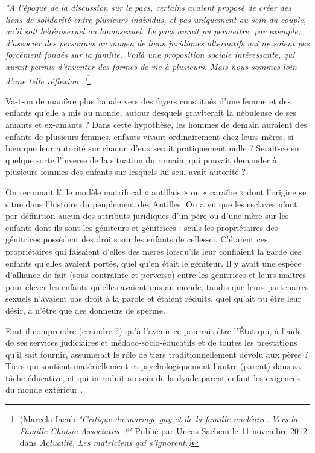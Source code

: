\begin{displayquote}
{\emph{"A l'époque de la discussion sur le pacs, certains avaient proposé de créer des liens de solidarité entre plusieurs individus, et pas uniquement au sein du couple, qu'il soit hétérosexuel ou homosexuel. Le pacs aurait pu permettre, par exemple, d'associer des personnes au moyen de liens juridiques alternatifs qui ne soient pas forcément fondés sur la famille. Voilà une proposition sociale intéressante, qui aurait permis d'inventer des formes de vie à plusieurs. Mais nous sommes loin d'une telle réflexion.."}\footnote{(Marcela Iacub \emph{"Critique du mariage gay et de la famille nucléaire. Vers la Famille Choisie Associative ?"} 
Publié par Uncas Sachem le 11 novembre 2012 dans \emph{Actualité, Les matriciens qui s'ignorent.)}}} 
 \end{displayquote}
 
 Va-t-on de manière plus banale vers des foyers constitués d'une femme et des enfants qu'elle a mis au monde, autour desquels graviterait la nébuleuse de ses amants et ex-amants ? Dans cette hypothèse, les hommes de demain auraient des enfants de plusieurs femmes, enfants vivant ordinairement chez leurs mères, si bien que leur autorité sur chacun d'eux serait pratiquement nulle ? Serait-ce en quelque sorte l'inverse de la situation du  romain, qui pouvait demander à plusieurs femmes des enfants sur lesquels lui seul avait autorité ? 
 
 On reconnait là le modèle matrifocal « antillais » ou « caraïbe » dont l'origine se situe dans l'histoire du peuplement des Antilles. On a vu que les esclaves n'ont par définition aucun des attributs juridiques d'un père ou d'une mère sur les enfants dont ils sont les géniteurs et génitrices : seuls les propriétaires des génitrices possèdent des droits sur les enfants de celles-ci. C'étaient ces propriétaires qui faisaient d'elles des mères lorsqu'ils leur confiaient la garde des enfants qu'elles avaient portés, quel qu'en était le géniteur. Il y avait une espèce d'alliance de fait (sous contrainte et perverse) entre les génitrices et leurs maîtres pour élever les enfants qu'elles avaient mis au monde, tandis que leurs partenaires sexuels n'avaient pas droit à la parole et étaient réduits, quel qu'ait pu être leur désir,  à n'être que des donneurs de sperme. 
 

 
 Faut-il comprendre (craindre ?) qu'à l'avenir ce pourrait être l'État qui, à l'aide de ses services judiciaires et médoco-socio-éducatifs et de toutes les prestations qu'il sait fournir, assumerait le rôle de tiers traditionnellement dévolu aux pères ? Tiers qui soutient matériellement et psychologiquement l'autre (parent) dans sa tâche éducative, et qui introduit au sein de la dyade parent-enfant les exigences du monde extérieur .
 
